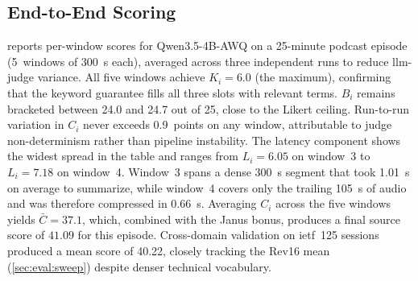 \documentclass[conference,letterpaper]{IEEEtran}
\begin{document}
\subsection{End-to-End Scoring}
\label{sec:eval:scoring}

 reports per-window scores for Qwen3.5-4B-AWQ on a \num{25}-minute podcast episode (\num{5}~windows of \SI{300}{\second} each), averaged across three independent runs to reduce \gls{llm}-judge variance.
All five windows achieve $K_i = 6.0$ (the maximum), confirming that the keyword guarantee fills all three slots with relevant terms.
$B_i$ remains bracketed between \num{24.0} and \num{24.7} out of \num{25}, close to the Likert ceiling.
Run-to-run variation in $C_i$ never exceeds \num{0.9}~points on any window, attributable to judge non-determinism rather than pipeline instability.
The latency component shows the widest spread in the table and ranges from $L_i = 6.05$ on window~\num{3} to $L_i = 7.18$ on window~\num{4}.
Window~\num{3} spans a dense \SI{300}{\second} segment that took \SI{1.01}{\second} on average to summarize, while window~\num{4} covers only the trailing \SI{105}{\second} of audio and was therefore compressed in \SI{0.66}{\second}.
Averaging $C_i$ across the five windows yields $\bar{C} = 37.1$, which, combined with the Janus bonus, produces a final source score of $\mathbf{41.09}$ for this episode.
Cross-domain validation on \gls{ietf}~125 sessions produced a mean score of \num{40.22}, closely tracking the Rev16 mean (\cref{sec:eval:sweep}) despite denser technical vocabulary.
\end{document}
